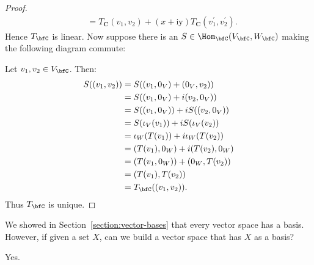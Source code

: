 \begin{proof}
\begin{equation*}
\begin{aligned}
                & =T_{\mathbf{C}}\left(v_1, v_2\right)+(x+\mathrm{iy}) T_{\mathbf{C}}\left(v_1^{\prime}, v_2^{\prime}\right) .
                \end{aligned}
                \end{equation*}
            Hence $T_\bfC$ is linear. Now suppose there is an $S \in \Hom_\bfC(V_\bfC,W_\bfC)$ making the following diagram commute:
                \begin{center}
                \end{center}
            Let $v_1,v_2 \in V_\bfC$. Then:
                \begin{equation*}
                \begin{split}
                    S((v_1,v_2))
                    & = S((v_1,0_V) + (0_V,v_2)) \\
                    & = S((v_1,0_V) + i(v_2,0_V)) \\
                    & = S((v_1,0_V)) + iS((v_2,0_V)) \\
                    & = S(\iota_V(v_1)) + iS(\iota_V(v_2)) \\
                    & = \iota_W(T(v_1)) + i \iota_W(T(v_2)) \\
                    & = (T(v_1),0_W) + i(T(v_2),0_W) \\
                    & = (T(v_1,0_W)) + (0_W,T(v_2)) \\
                    & = (T(v_1),T(v_2)) \\
                    & = T_\bfC((v_1,v_2)).
                \end{split}
                \end{equation*}
            Thus $T_\bfC$ is unique.
        \end{proof}

    \begin{question}
        We showed in Section~\ref{section:vector-bases} that every vector space has a basis. However, if given a set $X$, can we build a vector space that has $X$ as a basis?
    \end{question}
        \begin{answer}
            Yes.
        \end{answer}

